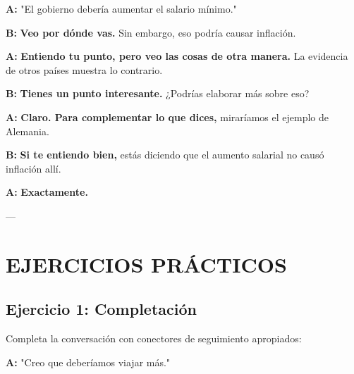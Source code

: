 \documentclass[a4paper,11pt]{article}
\begin{document}
\vspace{0.2cm}

\textbf{A:} "El gobierno debería aumentar el salario mínimo."

\vspace{0.2cm}

\textbf{B:} \textbf{Veo por dónde vas.} Sin embargo, eso podría causar inflación.

\vspace{0.2cm}

\textbf{A:} \textbf{Entiendo tu punto, pero veo las cosas de otra manera.} La evidencia de otros países muestra lo contrario.

\vspace{0.2cm}

\textbf{B:} \textbf{Tienes un punto interesante.} ¿Podrías elaborar más sobre eso?

\vspace{0.2cm}

\textbf{A:} \textbf{Claro. Para complementar lo que dices,} miraríamos el ejemplo de Alemania.

\vspace{0.2cm}

\textbf{B:} \textbf{Si te entiendo bien,} estás diciendo que el aumento salarial no causó inflación allí.

\vspace{0.2cm}

\textbf{A:} \textbf{Exactamente.}

\vspace{0.2cm}

---

\vspace{0.2cm}

\section{EJERCICIOS PRÁCTICOS}

\vspace{0.2cm}

\subsection{Ejercicio 1: Completación}

Completa la conversación con conectores de seguimiento apropiados:

\vspace{0.2cm}

\textbf{A:} "Creo que deberíamos viajar más."
\end{document}
